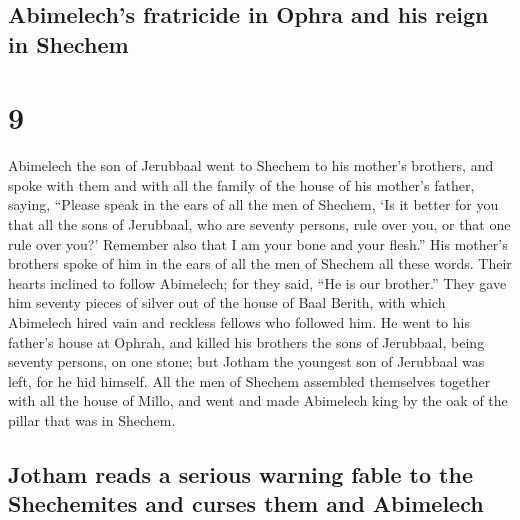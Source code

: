 \hypertarget{abimelechs-fratricide-in-ophra-and-his-reign-in-shechem}{%
\subsection{Abimelech's fratricide in Ophra and his reign in
Shechem}\label{abimelechs-fratricide-in-ophra-and-his-reign-in-shechem}}

\hypertarget{section-8}{%
\section{9}\label{section-8}}

 Abimelech the son of Jerubbaal went to Shechem to his
mother's brothers, and spoke with them and with all the family of the
house of his mother's father, saying,  ``Please speak in
the ears of all the men of Shechem, `Is it better for you that all the
sons of Jerubbaal, who are seventy persons, rule over you, or that one
rule over you?' Remember also that I am your bone and your flesh.''
 His mother's brothers spoke of him in the ears of all the
men of Shechem all these words. Their hearts inclined to follow
Abimelech; for they said, ``He is our brother.''  They
gave him seventy pieces of silver out of the house of Baal Berith, with
which Abimelech hired vain and reckless fellows who followed him.
 He went to his father's house at Ophrah, and killed his
brothers the sons of Jerubbaal, being seventy persons, on one stone; but
Jotham the youngest son of Jerubbaal was left, for he hid himself.
 All the men of Shechem assembled themselves together with
all the house of Millo, and went and made Abimelech king by the oak of
the pillar that was in Shechem.

\hypertarget{jotham-reads-a-serious-warning-fable-to-the-shechemites-and-curses-them-and-abimelech}{%
\subsection{Jotham reads a serious warning fable to the Shechemites and
curses them and
Abimelech}\label{jotham-reads-a-serious-warning-fable-to-the-shechemites-and-curses-them-and-abimelech}}

